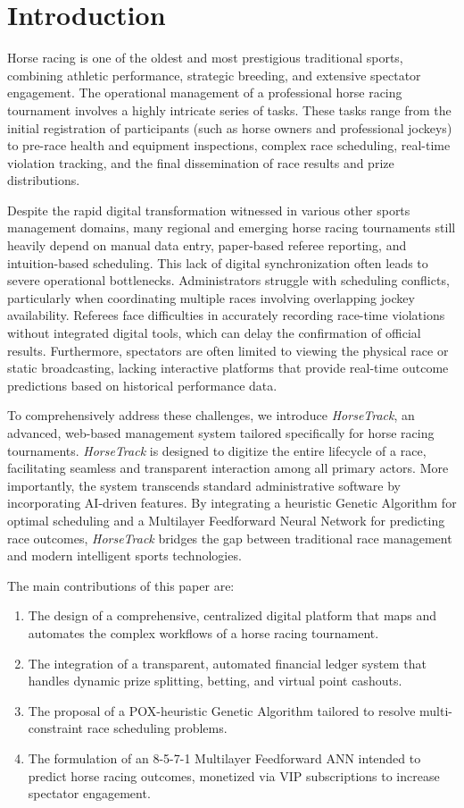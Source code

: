 \documentclass{llncs}
\begin{document}
\section{Introduction}
Horse racing is one of the oldest and most prestigious traditional sports, combining athletic performance, strategic breeding, and extensive spectator engagement. The operational management of a professional horse racing tournament involves a highly intricate series of tasks. These tasks range from the initial registration of participants (such as horse owners and professional jockeys) to pre-race health and equipment inspections, complex race scheduling, real-time violation tracking, and the final dissemination of race results and prize distributions. 

Despite the rapid digital transformation witnessed in various other sports management domains, many regional and emerging horse racing tournaments still heavily depend on manual data entry, paper-based referee reporting, and intuition-based scheduling. This lack of digital synchronization often leads to severe operational bottlenecks. Administrators struggle with scheduling conflicts, particularly when coordinating multiple races involving overlapping jockey availability. Referees face difficulties in accurately recording race-time violations without integrated digital tools, which can delay the confirmation of official results. Furthermore, spectators are often limited to viewing the physical race or static broadcasting, lacking interactive platforms that provide real-time outcome predictions based on historical performance data.

To comprehensively address these challenges, we introduce \textit{HorseTrack}, an advanced, web-based management system tailored specifically for horse racing tournaments. \textit{HorseTrack} is designed to digitize the entire lifecycle of a race, facilitating seamless and transparent interaction among all primary actors. More importantly, the system transcends standard administrative software by incorporating AI-driven features. By integrating a heuristic Genetic Algorithm for optimal scheduling and a Multilayer Feedforward Neural Network for predicting race outcomes, \textit{HorseTrack} bridges the gap between traditional race management and modern intelligent sports technologies.

The main contributions of this paper are:
\begin{enumerate}
    \item The design of a comprehensive, centralized digital platform that maps and automates the complex workflows of a horse racing tournament.
    \item The integration of a transparent, automated financial ledger system that handles dynamic prize splitting, betting, and virtual point cashouts.
    \item The proposal of a POX-heuristic Genetic Algorithm tailored to resolve multi-constraint race scheduling problems.
    \item The formulation of an 8-5-7-1 Multilayer Feedforward ANN intended to predict horse racing outcomes, monetized via VIP subscriptions to increase spectator engagement.
\end{enumerate}
\end{document}
